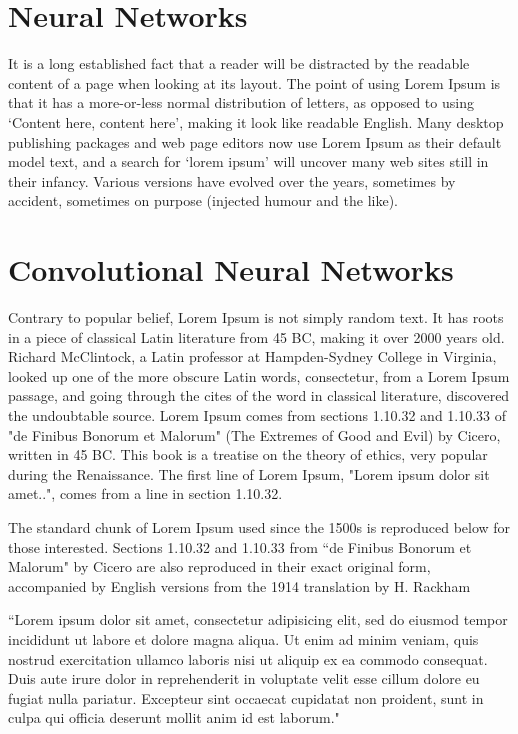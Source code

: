 \section{Neural Networks} %


It is a long established fact that a reader will be distracted by the readable content of a page when looking at its layout. The point of using Lorem Ipsum is that it has a more-or-less normal distribution of letters, as opposed to using `Content here, content here', making it look like readable English. Many desktop publishing packages and web page editors now use Lorem Ipsum as their default model text, and a search for `lorem ipsum' will uncover many web sites still in their infancy. Various versions have evolved over the years, sometimes by accident, sometimes on purpose (injected humour and the like).

\section{Convolutional Neural Networks}  %
\label{section1.3}

Contrary to popular belief, Lorem Ipsum is not simply random text. It has roots in a piece of classical Latin literature from 45 BC, making it over 2000 years old. Richard McClintock, a Latin professor at Hampden-Sydney College in Virginia, looked up one of the more obscure Latin words, consectetur, from a Lorem Ipsum passage, and going through the cites of the word in classical literature, discovered the undoubtable source. Lorem Ipsum comes from sections 1.10.32 and 1.10.33 of "de Finibus Bonorum et Malorum" (The Extremes of Good and Evil) by Cicero, written in 45 BC. This book is a treatise on the theory of ethics, very popular during the Renaissance. The first line of Lorem Ipsum, "Lorem ipsum dolor sit amet..", comes from a line in section 1.10.32.

The standard chunk of Lorem Ipsum used since the 1500s is reproduced below for those interested. Sections 1.10.32 and 1.10.33 from ``de Finibus Bonorum et Malorum" by Cicero are also reproduced in their exact original form, accompanied by English versions from the 1914 translation by H. Rackham

``Lorem ipsum dolor sit amet, consectetur adipisicing elit, sed do eiusmod tempor incididunt ut labore et dolore magna aliqua. Ut enim ad minim veniam, quis nostrud exercitation ullamco laboris nisi ut aliquip ex ea commodo consequat. Duis aute irure dolor in reprehenderit in voluptate velit esse cillum dolore eu fugiat nulla pariatur. Excepteur sint occaecat cupidatat non proident, sunt in culpa qui officia deserunt mollit anim id est laborum."

